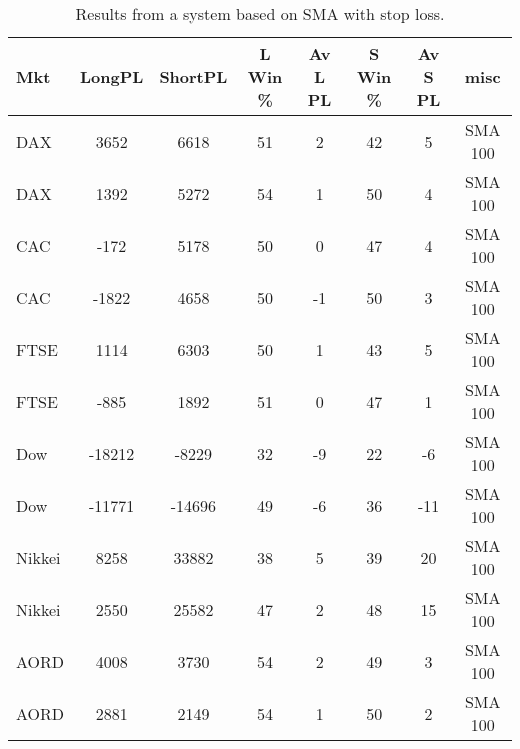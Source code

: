 \begin{table}[ht]
\centering
\caption[Results from a system based on SMA with stop loss]{Results from a system based on SMA with stop loss.} 
\label{tab:sma_results_Sloss}
\begin{tabular}{lccccccc}
  \toprule Mkt & LongPL & ShortPL & L Win \% & Av L PL & S Win \% & Av S PL & misc \\ 
  \midrule DAX & 3652 & 6618 & 51 & 2 & 42 & 5 & SMA 100 \\ 
  DAX & 1392 & 5272 & 54 & 1 & 50 & 4 & SMA 100 \\ 
  CAC & -172 & 5178 & 50 & 0 & 47 & 4 & SMA 100 \\ 
  CAC & -1822 & 4658 & 50 & -1 & 50 & 3 & SMA 100 \\ 
  FTSE & 1114 & 6303 & 50 & 1 & 43 & 5 & SMA 100 \\ 
  FTSE & -885 & 1892 & 51 & 0 & 47 & 1 & SMA 100 \\ 
  Dow & -18212 & -8229 & 32 & -9 & 22 & -6 & SMA 100 \\ 
  Dow & -11771 & -14696 & 49 & -6 & 36 & -11 & SMA 100 \\ 
  Nikkei & 8258 & 33882 & 38 & 5 & 39 & 20 & SMA 100 \\ 
  Nikkei & 2550 & 25582 & 47 & 2 & 48 & 15 & SMA 100 \\ 
  AORD & 4008 & 3730 & 54 & 2 & 49 & 3 & SMA 100 \\ 
  AORD & 2881 & 2149 & 54 & 1 & 50 & 2 & SMA 100 \\ 
   \bottomrule \end{tabular}
\end{table}
